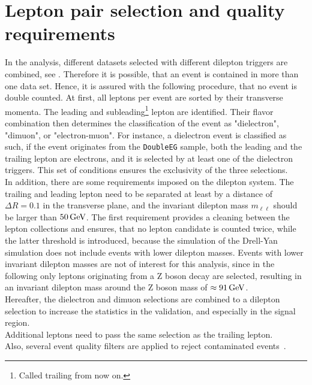 \section{Lepton pair selection and quality requirements}\label{sec:lepPair}
In the analysis, different datasets selected with different dilepton triggers are combined, see . Therefore it is possible, that an event is contained in more than one data set. Hence, it is assured with the following procedure, that no event is double counted. At first, all leptons per event are sorted by their transverse momenta. The leading and subleading\footnote{Called trailing from now on.} lepton are identified. Their flavor combination then determines the classification of the event as "dielectron", "dimuon", or "electron-muon". For instance, a dielectron event is classified as such, if  the event originates from the \texttt{DoubleEG} sample, both the leading and the trailing lepton are electrons, and it is selected by at least one of the dielectron triggers. This set of conditions ensures the exclusivity of the three selections.\\
In addition, there are some requirements imposed on the dilepton system. The trailing and leading lepton need to be separated at least by a distance of $\Delta R=0.1$ in the transverse plane, and the invariant dilepton mass $m_{\ell\ell}$ should be larger than $50\,\text{Ge\hspace{-.08em}V}$. The first requirement provides a cleaning between the lepton collections and ensures, that no lepton candidate is counted twice, while the latter threshold is introduced, because the simulation of the Drell-Yan simulation does not include events with lower dilepton masses. Events with lower invariant dilepton masses are not of interest for this analysis, since in the following only leptons originating from a Z boson decay are selected, resulting in an invariant dilepton mass around the Z boson mass of $\approx91\,\text{Ge\hspace{-.08em}V}$.\\
Hereafter, the dielectron and dimuon selections are combined to a dilepton selection to increase the statistics in the validation, and especially in the signal region.\\
Additional leptons need to pass the same selection as the trailing lepton.
\\
Also, several event quality filters are applied to reject contaminated events~\cite{MetFilter}.
